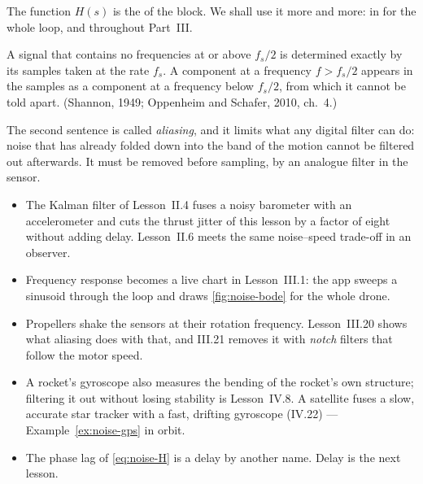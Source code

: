 The function $H(s)$ is the  of the block. We shall use it more and more: in  for the whole loop, and throughout Part~III.

\begin{theorem}[Sampling]
\label{thm:noise-sampling}
A signal that contains no frequencies at or above $f_s/2$ is determined exactly by its samples taken at the rate $f_s$. A component at a frequency $f > f_s/2$ appears in the samples as a component at a frequency below $f_s/2$, from which it cannot be told apart. (Shannon, 1949; Oppenheim and Schafer, 2010, ch.~4.)
\end{theorem}

The second sentence is called \emph{aliasing}, and it limits what any digital filter can do: noise that has already folded down into the band of the motion cannot be filtered out afterwards. It must be removed before sampling, by an analogue filter in the sensor.

\begin{lookahead}
\begin{itemize}[leftmargin=1.2em]
  \item The Kalman filter of Lesson~II.4 fuses a noisy barometer with an accelerometer and cuts the thrust jitter of this lesson by a factor of eight without adding delay. Lesson~II.6 meets the same noise–speed trade-off in an observer.
  \item Frequency response becomes a live chart in Lesson~III.1: the app sweeps a sinusoid through the loop and draws \cref{fig:noise-bode} for the whole drone.
  \item Propellers shake the sensors at their rotation frequency. Lesson~III.20 shows what aliasing does with that, and III.21 removes it with \emph{notch} filters that follow the motor speed.
  \item A rocket's gyroscope also measures the bending of the rocket's own structure; filtering it out without losing stability is Lesson~IV.8. A satellite fuses a slow, accurate star tracker with a fast, drifting gyroscope (IV.22) — Example~\ref{ex:noise-gps} in orbit.
  \item The phase lag of \cref{eq:noise-H} is a delay by another name. Delay is the next lesson.
\end{itemize}
\end{lookahead}

